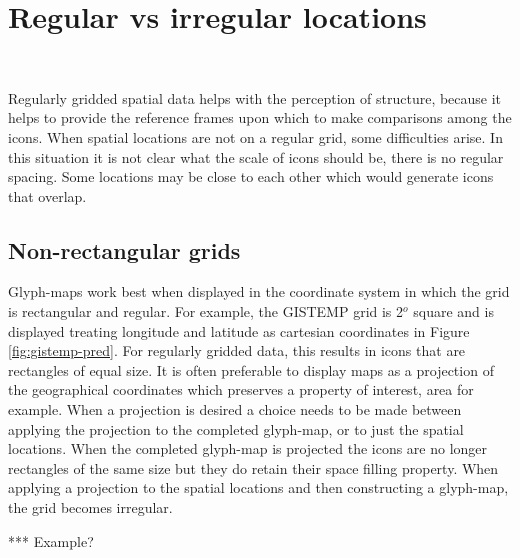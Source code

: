 \documentclass[oneside]{article}
\begin{document}
\section{Regular vs irregular locations}~\label{sec:irregular}

Regularly gridded spatial data helps with the perception of structure, because it helps to provide the reference frames upon which to make comparisons among the icons. When spatial locations are not on a regular grid, some difficulties arise. In this situation it is not clear what the scale of icons should be, there is no regular spacing. Some locations may be close to each other which would generate icons that overlap. 

\subsection{Non-rectangular grids}

Glyph-maps work best when displayed in the coordinate system in which the grid is rectangular and regular.  For example, the GISTEMP grid is 2$^o$ square and is displayed treating longitude and latitude as cartesian coordinates in Figure \ref{fig:gistemp-pred}.  For regularly gridded data, this results in icons that are rectangles of equal size.  It is often preferable to display maps as a projection of the geographical coordinates which preserves a property of interest, area for example. When a projection is desired a choice needs to be made between applying the projection to the completed glyph-map, or to just the spatial locations.  When the completed glyph-map is projected the icons are no longer rectangles of the same size but they do retain their space filling property.  When applying a projection to the spatial locations and then constructing a glyph-map, the grid becomes irregular. 

*** Example?
\end{document}
